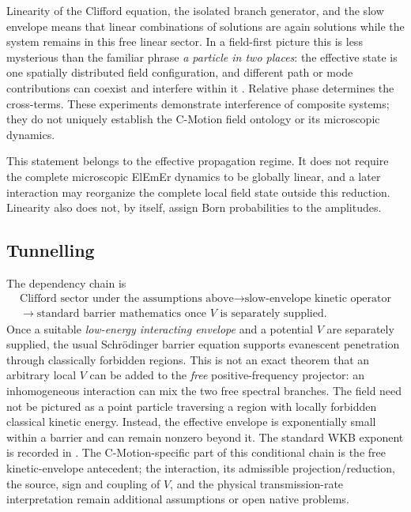 \documentclass[11pt]{article}
\theoremstyle{definition}
\newcommand{\ElEmEr}{\mbox{ElEmEr}}
\begin{document}
Linearity of the Clifford equation, the isolated branch generator, and the slow envelope means
that linear combinations of solutions are again solutions while the system remains in this
free linear sector.  In a field-first picture this is less mysterious than the familiar phrase
\emph{a particle in two places}: the effective state is one spatially distributed field
configuration, and different path or mode contributions can coexist and interfere within it
\cite{Arndt1999C60,Fein2019superposition}. Relative phase determines the cross-terms.
These experiments demonstrate interference of composite systems; they do not
uniquely establish the C-Motion field ontology or its microscopic dynamics.

This statement belongs to the effective propagation regime.  It does not require the complete
microscopic \ElEmEr{} dynamics to be globally linear, and a later interaction may reorganize
the complete local field state outside this reduction.  Linearity also does not, by itself,
assign Born probabilities to the amplitudes.

\subsection{Tunnelling}

The dependency chain is
\begin{equation}
\begin{gathered}
 \text{Clifford sector under the assumptions above}
 \longrightarrow
 \text{slow-envelope kinetic operator}\\
 \longrightarrow
 \text{standard barrier mathematics once }V\text{ is separately supplied}.
\end{gathered}
\end{equation}
Once a suitable \emph{low-energy interacting envelope} and a potential $V$ are separately
supplied, the usual Schr\"odinger barrier equation supports evanescent penetration through
classically forbidden regions.  This is not an exact theorem that an arbitrary local $V$
can be added to the \emph{free} positive-frequency projector: an inhomogeneous interaction
can mix the two free spectral branches.  The field need not be pictured as a point particle
traversing a region with locally forbidden classical kinetic energy.  Instead, the effective
envelope is exponentially small within a barrier and can remain nonzero beyond it.
The standard WKB exponent is recorded in 
\cite{Wentzel1926WKB}.  The C-Motion-specific part of this conditional chain is the free
kinetic-envelope antecedent; the interaction, its admissible projection/reduction, the
source, sign and coupling of $V$, and the physical transmission-rate interpretation
remain additional assumptions or open native problems.
\end{document}
